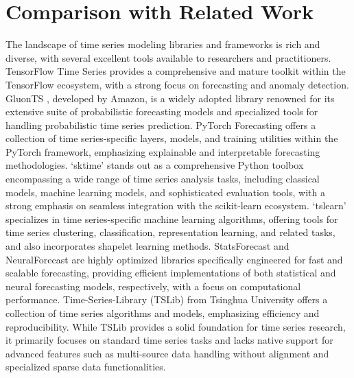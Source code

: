 \documentclass[twoside,11pt]{article}
\begin{document}
\section{Comparison with Related Work}
The landscape of time series modeling libraries and frameworks is rich and diverse, with several excellent tools available to researchers and practitioners. TensorFlow Time Series \citep{abadi2016tensorflow} provides a comprehensive and mature toolkit within the TensorFlow ecosystem, with a strong focus on forecasting and anomaly detection. GluonTS \citep{alexandrov2020gluonts}, developed by Amazon, is a widely adopted library renowned for its extensive suite of probabilistic forecasting models and specialized tools for handling probabilistic time series prediction. PyTorch Forecasting \citep{paszke2019pytorch} offers a collection of time series-specific layers, models, and training utilities within the PyTorch framework, emphasizing explainable and interpretable forecasting methodologies. `sktime' \citep{loning2019sktime} stands out as a comprehensive Python toolbox encompassing a wide range of time series analysis tasks, including classical models, machine learning models, and sophisticated evaluation tools, with a strong emphasis on seamless integration with the scikit-learn ecosystem. `tslearn' \citep{tavenard2020tslearn} specializes in time series-specific machine learning algorithms, offering tools for time series clustering, classification, representation learning, and related tasks, and also incorporates shapelet learning methods. StatsForecast \citep{garza2022statsforecast} and NeuralForecast \citep{olivares2022library_neuralforecast} are highly optimized libraries specifically engineered for fast and scalable forecasting, providing efficient implementations of both statistical and neural forecasting models, respectively, with a focus on computational performance. Time-Series-Library (TSLib) \citep{wu2023timesnet} from Tsinghua University offers a collection of time series algorithms and models, emphasizing efficiency and reproducibility. While TSLib provides a solid foundation for time series research, it primarily focuses on standard time series tasks and lacks native support for advanced features such as multi-source data handling without alignment and specialized sparse data functionalities.
\end{document}
